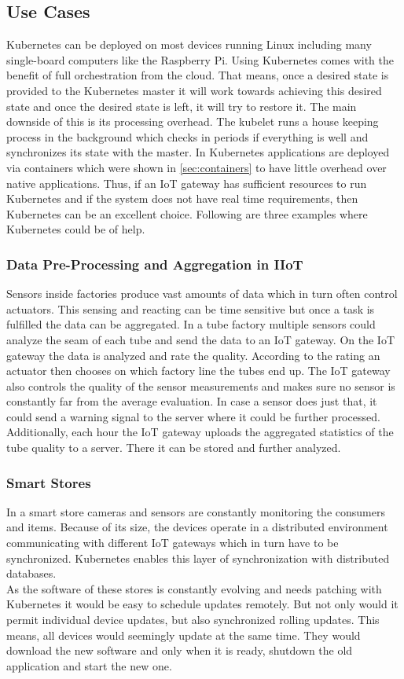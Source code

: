 \subsection{Use Cases}
Kubernetes can be deployed on most devices running Linux including many single-board computers like the Raspberry Pi. Using Kubernetes comes with the benefit of full orchestration from the cloud. That means, once a desired state is provided to the Kubernetes master it will work towards achieving this desired state and once the desired state is left, it will try to restore it. The main downside of this is its processing overhead. The kubelet runs a house keeping process in the background which checks in periods if everything is well and synchronizes its state with the master. In Kubernetes applications are deployed via containers which were shown in \cref{sec:containers} to have little overhead over native applications.
Thus, if an IoT gateway has sufficient resources to run Kubernetes and if the system does not have real time requirements, then Kubernetes can be an excellent choice. Following are three examples where Kubernetes could be of help. 

\subsubsection{Data Pre-Processing and Aggregation in IIoT}
Sensors inside factories produce vast amounts of data which in turn often control actuators. This sensing and reacting can be time sensitive but once a task is fulfilled the data can be aggregated. In a tube factory multiple sensors could analyze the seam of each tube and send the data to an IoT gateway. On the IoT gateway the data is analyzed and rate the quality. According to the rating an actuator then chooses on which factory line the tubes end up. The IoT gateway also controls the quality of the sensor measurements and makes sure no sensor is constantly far from the average evaluation. In case a sensor does just that, it could send a warning signal to the server where it could be further processed. Additionally, each hour the IoT gateway uploads the aggregated statistics of the tube quality to a server. There it can be stored and further analyzed.\\



\subsubsection{Smart Stores}
In a smart store cameras and sensors are constantly monitoring the consumers and items. Because of its size, the devices operate in a distributed environment communicating with different IoT gateways which in turn have to be synchronized. Kubernetes enables this layer of synchronization with distributed databases.\\
As the software of these stores is constantly evolving and needs patching with Kubernetes it would be easy to schedule updates remotely. But not only would it permit individual device updates, but also synchronized rolling updates. This means, all devices would seemingly update at the same time. They would download the new software and only when it is ready, shutdown the old application and start the new one.


